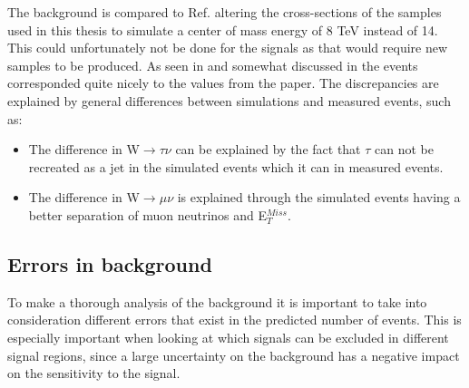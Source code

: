 The background is compared to Ref. \citep{ATLAS-CONF-2012-147} altering the cross-sections of the samples used in this thesis to simulate a center of mass energy of 8 TeV instead of 14. This could unfortunately not be done for the signals as that would require new samples to be produced. As seen in  and somewhat discussed in  the events corresponded quite nicely to the values from the paper. The discrepancies are explained by general differences between simulations and measured events, such as:
\begin{itemize}
\item The difference in W$\rightarrow\tau\nu$ can be explained by the fact that $\tau$ can not be recreated as a jet in the simulated events which it can in measured events.

\item The difference in W$\rightarrow\mu\nu$ is explained through the simulated events having a better separation of muon neutrinos and E$_T^{Miss}$.
\end{itemize}

\subsection{Errors in background}\label{subsec:errdata}
To make a thorough analysis of the background it is important to take into consideration different errors that exist in the predicted number of events. This is especially important when looking at which signals can be excluded in different signal regions, since a large uncertainty on the background has a negative impact on the sensitivity to the signal.



